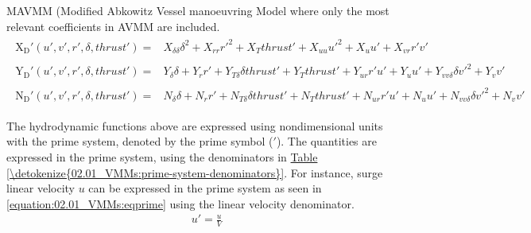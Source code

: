 \documentclass[review]{elsarticle}
\begin{document}
MAVMM (Modified Abkowitz Vessel manoeuvring Model where only the most relevant coefficients in AVMM are included.
\begin{equation}\label{equation:02.01_VMMs:eqxmartinssimple}
\begin{split}\begin{split}
\operatorname{X_{D}'}{\left(u',v',r',\delta,thrust' \right)} = & X_{\delta\delta} \delta^{2} + X_{rr} r'^{2} + X_{T} thrust' + X_{uu} u'^{2} + X_{u} u' + X_{vr} r' v' 
\end{split}\end{split}
\end{equation}\begin{equation}\label{equation:02.01_VMMs:eqymartinssimple}
\begin{split}\begin{split}
\operatorname{Y_{D}'}{\left(u',v',r',\delta,thrust' \right)} = & Y_{\delta} \delta + Y_{r} r' + Y_{T\delta} \delta thrust' + Y_{T} thrust' + Y_{ur} r' u' + Y_{u} u' + Y_{vv\delta} \delta v'^{2} + Y_{v} v' 
\end{split}\end{split}
\end{equation}\begin{equation}\label{equation:02.01_VMMs:eqnmartinssimple}
\begin{split}\begin{split}
\operatorname{N_{D}'}{\left(u',v',r',\delta,thrust' \right)} = & N_{\delta} \delta + N_{r} r' + N_{T\delta} \delta thrust' + N_{T} thrust' + N_{ur} r' u' + N_{u} u' + N_{vv\delta} \delta v'^{2} + N_{v} v' 
\end{split}\end{split}
\end{equation}
 
The hydrodynamic functions above are expressed using nondimensional units with the prime system, denoted by the prime symbol (\('\)). The quantities are expressed in the prime system, using the denominators in \hyperref[\detokenize{02.01_VMMs:prime-system-denominators}]{Table \ref{\detokenize{02.01_VMMs:prime-system-denominators}}}. For instance, surge linear velocity \(u\) can be expressed in the prime system as seen in \autoref{equation:02.01_VMMs:eqprime} using the linear velocity denominator.
\begin{equation}\label{equation:02.01_VMMs:eqprime}
\begin{split}\displaystyle u'=\frac{u}{V}\end{split}
\end{equation}
 
\end{document}
